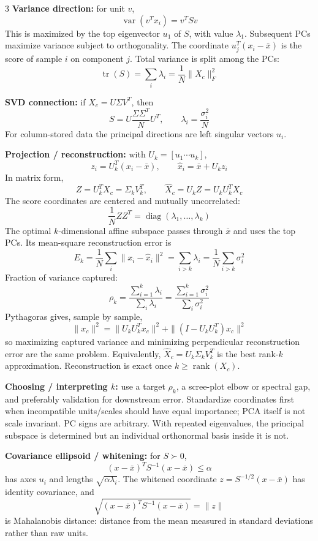 \documentclass[10pt]{article}
\newcommand{\sub}[1]{\textbf{#1}}
\newcommand{\rank}{\operatorname{rank}}
\newcommand{\diag}{\operatorname{diag}}
\newcommand{\tr}{\operatorname{tr}}
\newcommand{\Var}{\operatorname{var}}
\begin{document}
\begin{multicols*}{3}
\sub{Variance direction:} for unit \(v\),
\[
\Var(v^Tx_i)=v^TSv
\]
This is maximized by the top eigenvector \(u_1\) of \(S\), with value
\(\lambda_1\). Subsequent PCs maximize variance subject to orthogonality.
The coordinate \(u_j^T(x_i-\bar x)\) is the score of sample \(i\) on
component \(j\). Total variance is split among the PCs:
\[
\tr(S)=\sum_i\lambda_i=\frac1N\|X_c\|_F^2
\]

\sub{SVD connection:} if \(X_c=U\Sigma V^T\), then
\[
S=U\frac{\Sigma\Sigma^T}{N}U^T,\qquad
\lambda_i=\frac{\sigma_i^2}{N}
\]
For column-stored data the principal directions are left singular vectors
\(u_i\).

\sub{Projection / reconstruction:} with
\(U_k=[u_1\cdots u_k]\),
\[
z_i=U_k^T(x_i-\bar x),\qquad
\hat x_i=\bar x+U_kz_i
\]
In matrix form,
\[
Z=U_k^TX_c=\Sigma_kV_k^T,\qquad
\widehat X_c=U_kZ=U_kU_k^TX_c
\]
The score coordinates are centered and mutually uncorrelated:
\[
\frac1NZZ^T=\diag(\lambda_1,\ldots,\lambda_k)
\]
The optimal \(k\)-dimensional affine subspace passes through \(\bar x\)
and uses the top PCs. Its mean-square reconstruction error is
\[
E_k=\frac1N\sum_i\|x_i-\hat x_i\|^2
=\sum_{i>k}\lambda_i
=\frac1N\sum_{i>k}\sigma_i^2
\]
Fraction of variance captured:
\[
\rho_k=\frac{\sum_{i=1}^k\lambda_i}{\sum_i\lambda_i}
=\frac{\sum_{i=1}^k\sigma_i^2}{\sum_i\sigma_i^2}
\]
Pythagoras gives, sample by sample,
\[
\|x_c\|^2=\|U_kU_k^Tx_c\|^2+\|(I-U_kU_k^T)x_c\|^2
\]
so maximizing captured variance and minimizing perpendicular
reconstruction error are the same problem. Equivalently,
\(\widehat X_c=U_k\Sigma_kV_k^T\) is the best rank-\(k\) approximation.
Reconstruction is exact once \(k\ge\rank(X_c)\).

\sub{Choosing / interpreting \(k\):} use a target \(\rho_k\), a scree-plot
elbow or spectral gap, and preferably validation for downstream error.
Standardize coordinates first when incompatible units/scales should have
equal importance; PCA itself is not scale invariant.
PC signs are arbitrary. With repeated eigenvalues, the principal
subspace is determined but an individual orthonormal basis inside it is
not.

\sub{Covariance ellipsoid / whitening:} for \(S\succ0\),
\[
(x-\bar x)^TS^{-1}(x-\bar x)\le\alpha
\]
has axes \(u_i\) and lengths \(\sqrt{\alpha\lambda_i}\). The whitened
coordinate \(z=S^{-1/2}(x-\bar x)\) has identity covariance, and
\[
\sqrt{(x-\bar x)^TS^{-1}(x-\bar x)}=\|z\|
\]
is Mahalanobis distance: distance from the mean measured in standard
deviations rather than raw units.


\end{multicols*}
\end{document}
